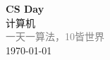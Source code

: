 \vspace*{\fill}
\begin{center}
    \textcolor{orange!50}{\Huge\textbf{CS Day}} \\[1em]
    \textcolor{orange!60!pink}{\Large 计算机} \\[2em]
    \textcolor{gray}{\large 一天一算法，10皆世界} \\[1em]
    \today
\end{center}
\vspace*{\fill}
\clearpage


\clearpage

\clearpage

\clearpage
